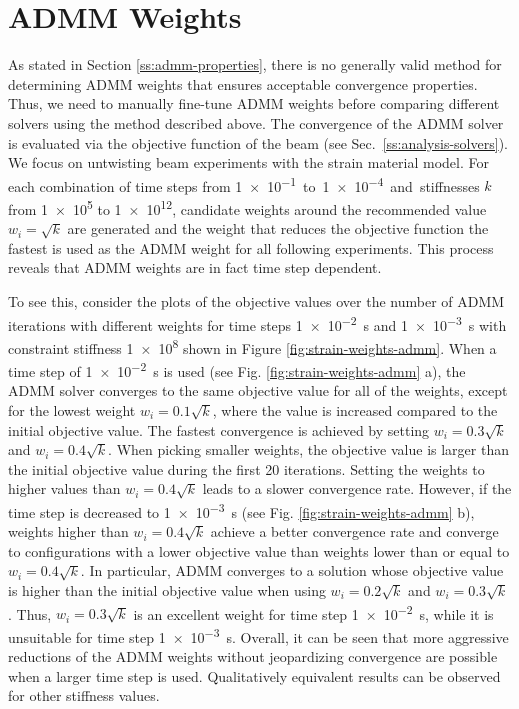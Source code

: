 \section{ADMM Weights}\label{ss:admm-weights}
As stated in Section \ref{ss:admm-properties}, there is no generally valid method for determining ADMM weights that ensures acceptable convergence properties.
Thus, we need to manually fine-tune ADMM weights before comparing different solvers using the method described above. The convergence of the ADMM solver is evaluated via 
the objective function of the beam (see Sec.\ \ref{ss:analysis-solvers}). We focus on untwisting beam experiments with the strain material model. For 
each combination of time steps from \SI{1e-1} to \SI{1e-4} and stiffnesses $k$ from \num{1e5} to \num{1e12}, candidate weights around the recommended value $w_i = \sqrt{k}$ 
are generated and the weight that reduces the objective function the fastest is used as the ADMM weight for all following experiments. 
This process reveals that ADMM weights are in fact time step dependent.

To see this, consider the plots of the objective values over the number of ADMM iterations with different weights for time steps \SI{1e-2}{\second} and 
\SI{1e-3}{\second} with constraint stiffness \num{1e8} shown in Figure \ref{fig:strain-weights-admm}. When a time step 
of \SI{1e-2}{\second} is used (see Fig. \ref{fig:strain-weights-admm} a), the ADMM solver converges to the same objective value for all of the weights, except for the 
lowest weight $w_i = 0.1\sqrt{k}$, where the value is increased compared to the initial objective value. The fastest convergence is achieved by setting $w_i = 0.3\sqrt{k}$ and 
$w_i = 0.4\sqrt{k}$. When picking smaller weights, the objective value is larger than the initial objective value during the first 20 iterations. Setting the weights to 
higher values than $w_i = 0.4\sqrt{k}$ leads to a slower convergence rate. However, if the time step is decreased to \SI{1e-3}{\second} (see Fig. \ref{fig:strain-weights-admm} b), 
weights higher than $w_i = 0.4\sqrt{k}$ achieve a better convergence rate and converge to configurations with a lower objective value than weights lower than 
or equal to $w_i = 0.4\sqrt{k}$. In particular, ADMM converges to a solution whose objective value is higher than the initial objective value when using $w_i = 0.2\sqrt{k}$ and 
$w_i = 0.3\sqrt{k}$. Thus, $w_i = 0.3\sqrt{k}$ is an excellent weight for time step \SI{1e-2}{\second}, while it is unsuitable for time step \SI{1e-3}{\second}. Overall, it 
can be seen that more aggressive reductions of the ADMM weights without jeopardizing convergence are possible when a larger time step is used. Qualitatively equivalent results 
can be observed for other stiffness values. 

